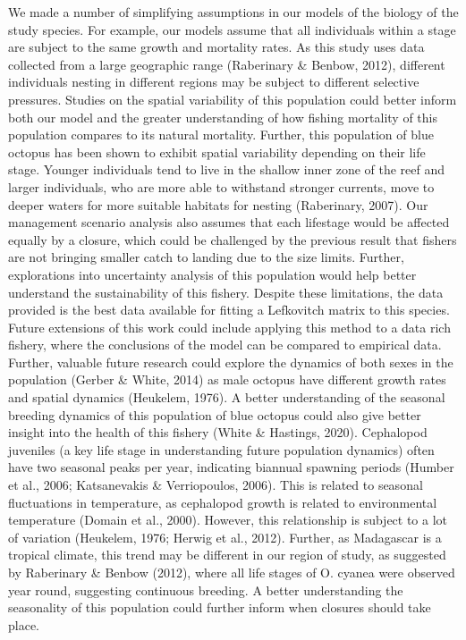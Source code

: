 \documentclass[
]{article}
\begin{document}
We made a number of simplifying assumptions in our models of the biology of the study species. For example, our models assume that all individuals within a stage are subject to the same growth and mortality rates. As this study uses data collected from a large geographic range (Raberinary \& Benbow, 2012), different individuals nesting in different regions may be subject to different selective pressures. Studies on the spatial variability of this population could better inform both our model and the greater understanding of how fishing mortality of this population compares to its natural mortality. Further, this population of blue octopus has been shown to exhibit spatial variability depending on their life stage. Younger individuals tend to live in the shallow inner zone of the reef and larger individuals, who are more able to withstand stronger currents, move to deeper waters for more suitable habitats for nesting (Raberinary, 2007). Our management scenario analysis also assumes that each lifestage would be affected equally by a closure, which could be challenged by the previous result that fishers are not bringing smaller catch to landing due to the size limits.
Further, explorations into uncertainty analysis of this population would help better understand the sustainability of this fishery. Despite these limitations, the data provided is the best data available for fitting a Lefkovitch matrix to this species. Future extensions of this work could include applying this method to a data rich fishery, where the conclusions of the model can be compared to empirical data. Further, valuable future research could explore the dynamics of both sexes in the population (Gerber \& White, 2014) as male octopus have different growth rates and spatial dynamics (Heukelem, 1976). A better understanding of the seasonal breeding dynamics of this population of blue octopus could also give better insight into the health of this fishery (White \& Hastings, 2020). Cephalopod juveniles (a key life stage in understanding future population dynamics) often have two seasonal peaks per year, indicating biannual spawning periods (Humber et al., 2006; Katsanevakis \& Verriopoulos, 2006). This is related to seasonal fluctuations in temperature, as cephalopod growth is related to environmental temperature (Domain et al., 2000). However, this relationship is subject to a lot of variation (Heukelem, 1976; Herwig et al., 2012). Further, as Madagascar is a tropical climate, this trend may be different in our region of study, as suggested by Raberinary \& Benbow (2012), where all life stages of O. cyanea were observed year round, suggesting continuous breeding. A better understanding the seasonality of this population could further inform when closures should take place.
\end{document}
